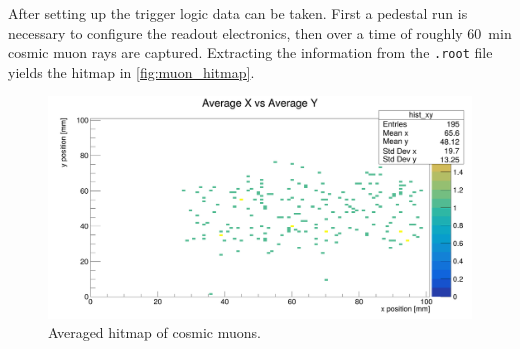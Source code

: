 \documentclass[sn-mathphys-num,iicol]{sn-jnl}
\theoremstyle{thmstyleone}
\theoremstyle{thmstyletwo}
\theoremstyle{thmstylethree}
\begin{document}
After setting up the trigger logic data can be taken. 
First a pedestal run is necessary to configure the readout electronics, then over a time of roughly \SI{60}{\minute} cosmic muon rays are captured.
Extracting the information from the \texttt{.root} file yields the hitmap in \autoref{fig:muon_hitmap}.

\begin{figure}
  \includegraphics[width=\linewidth]{../src/elsa/finished_plots/muon_hitmap_avg.png}
  \caption{Averaged hitmap of cosmic muons.}
  \label{fig:muon_hitmap}
\end{figure}

\end{document}
